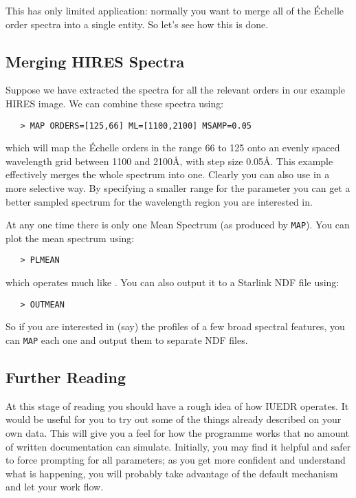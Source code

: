 This has only limited application: normally you want to merge all of the
\'{E}chelle order spectra into a single entity.  So let's see how this is done.


\subsection{Merging HIRES Spectra}

Suppose we have extracted the spectra for all the relevant orders in our
example HIRES image.  We can combine these spectra using:

\begin{verbatim}
   > MAP ORDERS=[125,66] ML=[1100,2100] MSAMP=0.05
\end{verbatim}

which will map the \'{E}chelle orders in the range 66 to 125 onto an evenly
spaced wavelength grid between 1100 and 2100\AA , with step size 0.05\AA\@.
This example effectively merges the whole spectrum into one.  Clearly you can
also use 
 in a more selective way.  By specifying a smaller range for
the 
 parameter you can get a better sampled spectrum
for the wavelength region you are interested in.

At any one time there is only one Mean Spectrum (as produced by \verb+MAP+)\@.
You can plot the mean spectrum using:

\begin{verbatim}
   > PLMEAN
\end{verbatim}

which operates much like \@.  You can also 
output it to a Starlink NDF file using:

\begin{verbatim}
   > OUTMEAN
\end{verbatim}

So if you are interested in (say) the profiles of a few broad spectral
features, you can \verb+MAP+ each one and output them to separate NDF files.


\subsection{Further Reading}

At this stage of reading you should have a rough idea of how IUEDR
operates.  It would be useful for you to try out some of the things already
described on your own data.  This will give you a feel for how the programme
works that no amount of written documentation can simulate.  Initially,
you may find it helpful and safer to force prompting for all parameters;
as you get more confident and understand what is happening, you will probably
take advantage of the default mechanism and let your work flow.

